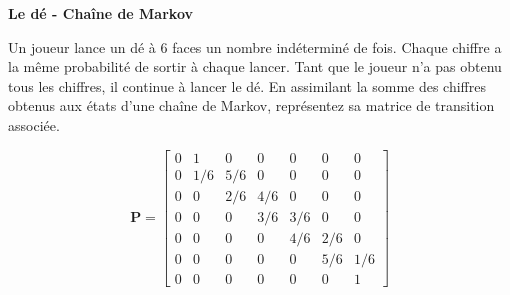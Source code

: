 \begin{Exercice}[10 minutes]\textbf{Le dé - Chaîne de Markov \optionnel}

Un joueur lance un dé à 6 faces un nombre indéterminé de fois. Chaque chiffre a la même probabilité de sortir à chaque lancer. Tant que le joueur n'a pas obtenu tous les chiffres, il continue à lancer le dé. En assimilant la somme des chiffres obtenus aux états d'une chaîne de Markov, représentez sa matrice de transition associée.

	 \begin{solution}

	\[ 
		\mathbf{P} =
		\begin{bmatrix}
		0 & 1 & 0 & 0 & 0 & 0 & 0  \\
		0 & 1/6 & 5/6 & 0 & 0 & 0 & 0  \\
		0 & 0 & 2/6 & 4/6 & 0 & 0 & 0  \\
		0 & 0 & 0 & 3/6 & 3/6 & 0 & 0  \\
		0 & 0 & 0 & 0 & 4/6 & 2/6 & 0  \\
		0 & 0 & 0 & 0 & 0 & 5/6 & 1/6  \\
		0 & 0 & 0 & 0 & 0 & 0 & 1 
		\end{bmatrix}
	\]
	 \end{solution}
\end{Exercice}




